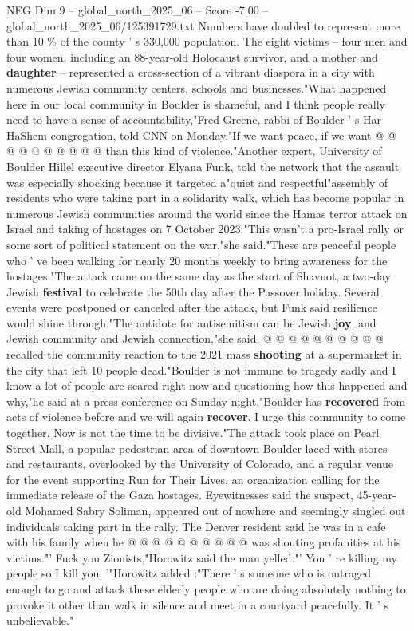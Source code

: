 \begin{textsample}{NEG Dim 9 – global\_north\_2025\_06 – Score -7.00 – global\_north\_2025\_06/125391729.txt}
Numbers have doubled to represent more than 10 \% of the county ' s 330,000 population.
The eight victims -- four men and four women, including an 88-year-old Holocaust survivor, and a mother and \textbf{daughter} -- represented a cross-section of a vibrant diaspora in a city with numerous Jewish community centers, schools and businesses."What happened here in our local community in Boulder is shameful, and I think people really need to have a sense of accountability,"Fred Greene, rabbi of Boulder ' s Har HaShem congregation, told CNN on Monday."If we want peace, if we want @ @ @ @ @ @ @ @ @ @ than this kind of violence."Another expert, University of Boulder Hillel executive director Elyana Funk, told the network that the assault was especially shocking because it targeted a"quiet and respectful"assembly of residents who were taking part in a solidarity walk, which has become popular in numerous Jewish communities around the world since the Hamas terror attack on Israel and taking of hostages on 7 October 2023."This wasn't a pro-Israel rally or some sort of political statement on the war,"she said."These are peaceful people who ' ve been walking for nearly 20 months weekly to bring awareness for the hostages."The attack came on the same day as the start of Shavuot, a two-day Jewish \textbf{festival} to celebrate the 50th day after the Passover holiday.
Several events were postponed or canceled after the attack, but Funk said resilience would shine through."The antidote for antisemitism can be Jewish \textbf{joy}, and Jewish community and Jewish connection,"she said. @ @ @ @ @ @ @ @ @ @ recalled the community reaction to the 2021 mass \textbf{shooting} at a supermarket in the city that left 10 people dead."Boulder is not immune to tragedy sadly and I know a lot of people are scared right now and questioning how this happened and why,"he said at a press conference on Sunday night."Boulder has \textbf{recovered} from acts of violence before and we will again \textbf{recover}.
I urge this community to come together.
Now is not the time to be divisive."The attack took place on Pearl Street Mall, a popular pedestrian area of downtown Boulder laced with stores and restaurants, overlooked by the University of Colorado, and a regular venue for the event supporting Run for Their Lives, an organization calling for the immediate release of the Gaza hostages.
Eyewitnesses said the suspect, 45-year-old Mohamed Sabry Soliman, appeared out of nowhere and seemingly singled out individuals taking part in the rally.
The Denver resident said he was in a cafe with his family when he @ @ @ @ @ @ @ @ @ @ was shouting profanities at his victims."' Fuck you Zionists,"Horowitz said the man yelled."' You ' re killing my people so I kill you. '"Horowitz added :"There ' s someone who is outraged enough to go and attack these elderly people who are doing absolutely nothing to provoke it other than walk in silence and meet in a courtyard peacefully.
It ' s unbelievable."

\end{textsample}
